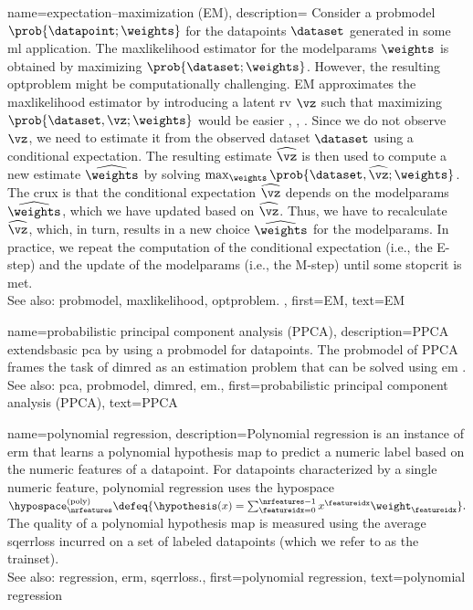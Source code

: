 {name={expectation–maximization (EM)}, 
	description={ 
		Consider a \gls{probmodel} $\prob{\datapoint; \weights}$ for the \glspl{datapoint} $\dataset$ generated in some 
		\gls{ml} application. The \gls{maxlikelihood} estimator for the \glspl{modelparam} $\weights$ is obtained by maximizing 
		$\prob{\dataset; \weights}$. However, the resulting \gls{optproblem} might be computationally 
		challenging. EM approximates the \gls{maxlikelihood} estimator by introducing a latent 
		\gls{rv} $\vz$ such that maximizing $\prob{\dataset,\vz; \weights}$ would be easier 
		\cite{hastie01statisticallearning}, \cite{BishopBook}, \cite{GraphModExpFamVarInfWainJor}. Since we 
		do not observe $\vz$, we need to estimate it from the observed \gls{dataset} $\dataset$ 
		using a conditional \gls{expectation}. The resulting estimate $\widehat{\vz}$ is then used to 
		compute a new estimate $\widehat{\weights}$ by solving $\max_{\weights} \prob{\dataset, \widehat{\vz}; \weights}$. 
		The crux is that the conditional \gls{expectation} $\widehat{\vz}$ depends on the \glspl{modelparam} $\widehat{\weights}$, 
		which we have updated based on $\widehat{\vz}$. Thus, we have to recalculate $\widehat{\vz}$, 
		which, in turn, results in a new choice $\widehat{\weights}$ for the \glspl{modelparam}. In practice, 
		we repeat the computation of the conditional \gls{expectation} (i.e., the E-step) and the update 
		of the \glspl{modelparam} (i.e., the M-step) until some \gls{stopcrit} is met. 
				\\
		See also: \gls{probmodel}, \gls{maxlikelihood}, \gls{optproblem}. },
	first={EM},
	text={EM}
}


{name={probabilistic principal component analysis (PPCA)}, 
	description={PPCA 
		extends\linebreak basic \gls{pca} by using a \gls{probmodel} for \glspl{datapoint}. 
		The \gls{probmodel} of PPCA frames the task of \gls{dimred} 
		as an estimation problem that can be solved using \gls{em} \cite{TippingProbPCA}.
				\\
		See also: \gls{pca}, \gls{probmodel}, \gls{dimred}, \gls{em}.},
	first={probabilistic principal component analysis (PPCA)},
	text={PPCA}
}
	
{name={polynomial regression}, 
	description={Polynomial 
		\gls{regression} is an instance of \gls{erm} that learns a polynomial \gls{hypothesis} 
		\gls{map} to predict a numeric \gls{label} based on the numeric \glspl{feature} of a \gls{datapoint}. 
		 For \glspl{datapoint} characterized by a single numeric \gls{feature}, polynomial \gls{regression} uses the \gls{hypospace} 
		$\hypospace^{(\rm poly)}_{\nrfeatures} \defeq \{ \hypothesis(x) = \sum_{\featureidx=0}^{\nrfeatures-1} x^{\featureidx} \weight_{\featureidx} \}.$
		The quality of a polynomial \gls{hypothesis} \gls{map} is measured using the average \gls{sqerrloss} 
		incurred on a set of \glspl{labeled datapoint} (which we refer to as the \gls{trainset}).
					\\
		See also: \gls{regression}, \gls{erm}, \gls{sqerrloss}.},
	first={polynomial regression},
	text={polynomial regression}
}

